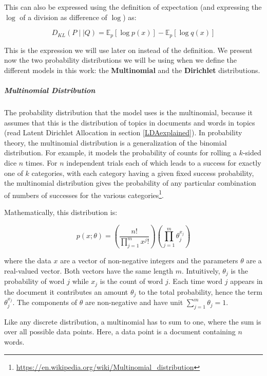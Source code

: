 \documentclass[12pt]{report}
\begin{document}
This can also be expressed using the definition of expectation (and
expressing the $\log$ of a division as difference of $\log$) as:

\begin{equation}
D_{KL}(P \mid \mid Q) = \mathbb{E}_{p}[\log{p(x)}] - \mathbb{E}_{p}[\log{q(x)}]
\end{equation}

This is the expression we will use later on instead of the definition.
We present now the two probability distributions we will be using when
we define the different models in this work: the \textbf{Multinomial}
and the \textbf{Dirichlet} distributions.


\subparagraph{Multinomial Distribution}

The probability distribution that the model uses is the multinomial, 
because it assumes that this is the distribution of topics in 
documents and words in topics (read Latent Dirichlet Allocation in section \ref{LDAexplained}). 
In probability theory, the multinomial distribution is a generalization
of the binomial distribution. For example, it models the probability
of counts for rolling a $k$-sided dice $n$ times. For $n$ independent trials
each of which leads to a success for exactly one of $k$ categories, with
each category having a given fixed success probability, the
multinomial distribution gives the probability of any particular
combination of numbers of successes for the various
categories\footnote{\url{https://en.wikipedia.org/wiki/Multinomial_distribution}}.

Mathematically, this distribution is: 

\begin{equation}
p(x;\theta) = \left(\frac{n!}{\prod\limits_{j=1}^m x^j!}\right)\left
(\prod\limits_{j=1}^m \theta_j^{x_j}\right)
\end{equation}

where the data $x$ are a vector of non-negative integers and the parameters
$\theta$ are a real-valued vector. Both vectors have the same length $m$.
Intuitively, $\theta_j$ is the probability of word $j$ while $x_j$ is the count
of word $j$. Each time word $j$ appears in the document it contributes an amount
$\theta_j$ to the total probability, hence the term $\theta_j^{x_j}$. The
components of $\theta$ are non-negative and have unit $\sum\limits_{j=1}^m
\theta_j = 1$.

Like any discrete distribution, a multinomial has to sum to one, where the sum
is over all possible data points. Here, a data point is a document containing
$n$ words\cite{Huang_maximumlikelihood}.
\end{document}
